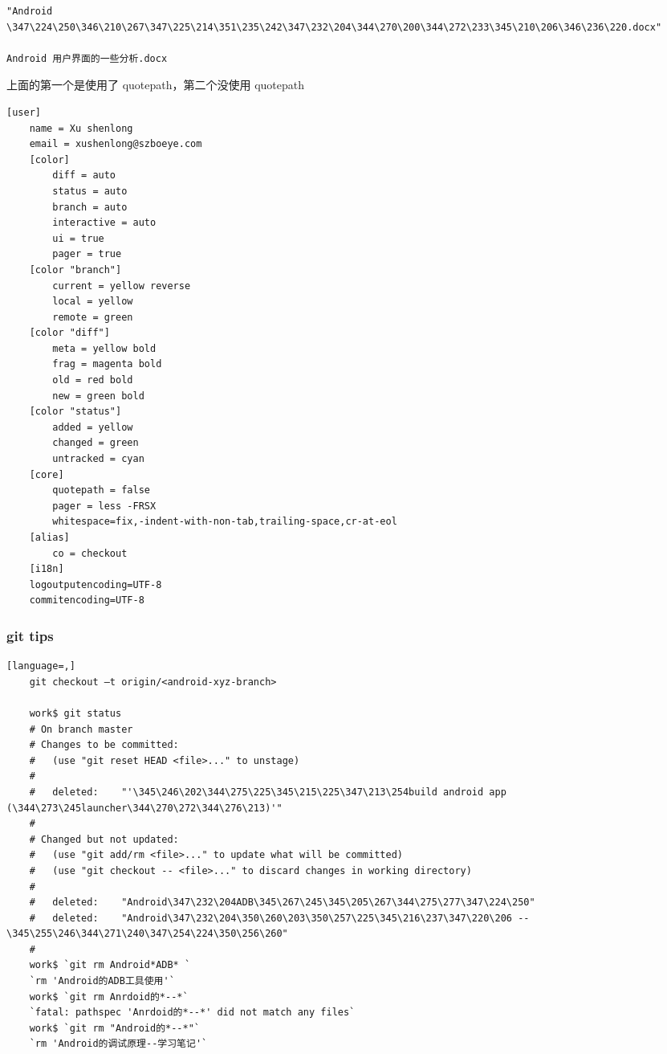 \documentclass[a4paper,titlepage]{article}
\begin{document}
\begin{lstlisting}[caption=git显示中文文件名的两种显示]
"Android \347\224\250\346\210\267\347\225\214\351\235\242\347\232\204\344\270\200\344\272\233\345\210\206\346\236\220.docx" 

Android 用户界面的一些分析.docx
\end{lstlisting} 
上面的第一个是使用了 quotepath，第二个没使用 quotepath

\begin{multicols}{2}
\begin{lstlisting}[caption=.gitconfig]
    [user]
	name = Xu shenlong
	email = xushenlong@szboeye.com 
    [color]
        diff = auto
        status = auto
        branch = auto
        interactive = auto
        ui = true
        pager = true 
    [color "branch"]
        current = yellow reverse
        local = yellow
        remote = green 
    [color "diff"]
        meta = yellow bold
        frag = magenta bold
        old = red bold
        new = green bold 
    [color "status"]
        added = yellow
        changed = green
        untracked = cyan 
    [core]
        quotepath = false
        pager = less -FRSX
        whitespace=fix,-indent-with-non-tab,trailing-space,cr-at-eol
    [alias]
        co = checkout
    [i18n]
	logoutputencoding=UTF-8
	commitencoding=UTF-8
\end{lstlisting}
\end{multicols}

\subsubsection{git tips}
\begin{lstlisting}[language=,]
    git checkout –t origin/<android-xyz-branch>

    work$ git status 
    # On branch master 
    # Changes to be committed: 
    #   (use "git reset HEAD <file>..." to unstage) 
    # 
    #	deleted:    "'\345\246\202\344\275\225\345\215\225\347\213\254build android app (\344\273\245launcher\344\270\272\344\276\213)'" 
    # 
    # Changed but not updated: 
    #   (use "git add/rm <file>..." to update what will be committed) 
    #   (use "git checkout -- <file>..." to discard changes in working directory) 
    # 
    #	deleted:    "Android\347\232\204ADB\345\267\245\345\205\267\344\275\277\347\224\250" 
    #	deleted:    "Android\347\232\204\350\260\203\350\257\225\345\216\237\347\220\206 -- \345\255\246\344\271\240\347\254\224\350\256\260" 
    # 
    work$ `git rm Android*ADB* `
    `rm 'Android的ADB工具使用'`
    work$ `git rm Anrdoid的*--*`
    `fatal: pathspec 'Anrdoid的*--*' did not match any files`
    work$ `git rm "Android的*--*"`
    `rm 'Android的调试原理--学习笔记'`
\end{lstlisting}
\end{document}
